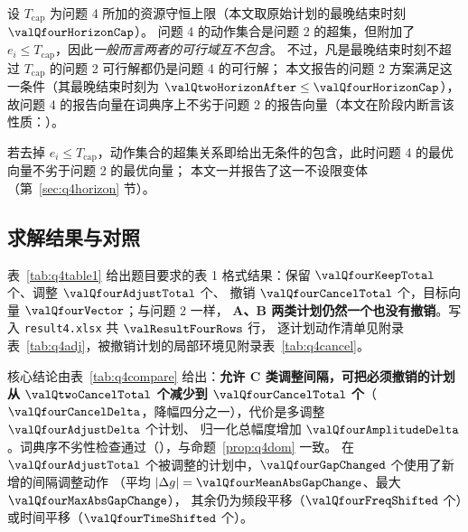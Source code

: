 \begin{proposition}\label{prop:q4dom}
设 $T_{\mathrm{cap}}$ 为问题 4 所加的资源守恒上限（本文取原始计划的最晚结束时刻 $\valQfourHorizonCap$）。
问题 4 的动作集合是问题 2 的超集，但附加了 $e_i\le T_{\mathrm{cap}}$，因此\emph{一般而言两者的可行域互不包含}。
不过，凡是最晚结束时刻不超过 $T_{\mathrm{cap}}$ 的问题 2 可行解都仍是问题 4 的可行解；
本文报告的问题 2 方案满足这一条件（其最晚结束时刻为 $\valQtwoHorizonAfter\le\valQfourHorizonCap$），
故问题 4 的报告向量在词典序上不劣于问题 2 的报告向量（本文在阶段内断言该性质：\valQfourLexNotWorse{}）。
\end{proposition}
\begin{remark}
若去掉 $e_i\le T_{\mathrm{cap}}$，动作集合的超集关系即给出无条件的包含，此时问题 4 的最优向量不劣于问题 2 的最优向量；
本文一并报告了这一不设限变体（第~\ref{sec:q4horizon} 节）。
\end{remark}

\subsection{求解结果与对照}

\begin{table}[htbp]
\centering\small
\begin{minipage}[t]{0.38\linewidth}
\centering
\caption{\textbf{问题 4：时频冲突消解的统计结果}（题目表 1 格式）。}\label{tab:q4table1}

\end{minipage}\hfill
\begin{minipage}[t]{0.58\linewidth}
\centering
\caption{问题 4 与问题 2 的逐类别对照。}\label{tab:q4compare}
\resizebox{\linewidth}{!}{}
\end{minipage}
\end{table}

表~\ref{tab:q4table1} 给出题目要求的表 1 格式结果：保留 $\valQfourKeepTotal$ 个、调整 $\valQfourAdjustTotal$ 个、
撤销 $\valQfourCancelTotal$ 个，目标向量 $\valQfourVector$；与问题 2 一样，
\textbf{A、B 两类计划仍然一个也没有撤销}。写入 \nolinkurl{result4.xlsx} 共 $\valResultFourRows$ 行，
逐计划动作清单见附录表~\ref{tab:q4adj}，被撤销计划的局部环境见附录表~\ref{tab:q4cancel}。

核心结论由表~\ref{tab:q4compare} 给出：\textbf{允许 C 类调整间隔，可把必须撤销的计划从 $\valQtwoCancelTotal$ 个减少到
$\valQfourCancelTotal$ 个}（$\valQfourCancelDelta$，降幅四分之一），代价是多调整 $\valQfourAdjustDelta$ 个计划、
归一化总幅度增加 $\valQfourAmplitudeDelta$。词典序不劣性检查通过（\valQfourLexNotWorse{}），与命题~\ref{prop:q4dom} 一致。
在 $\valQfourAdjustTotal$ 个被调整的计划中，$\valQfourGapChanged$ 个使用了新增的间隔调整动作
（平均 $|\Delta g|=\valQfourMeanAbsGapChange$、最大 $\valQfourMaxAbsGapChange$），
其余仍为频段平移（$\valQfourFreqShifted$ 个）或时间平移（$\valQfourTimeShifted$ 个）。

